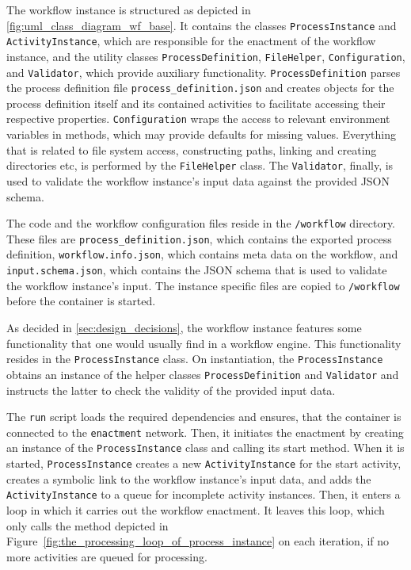     The workflow instance is structured as depicted in \ref{fig:uml_class_diagram_wf_base}. It contains the classes \texttt{ProcessInstance} and \texttt{ActivityInstance}, which are responsible for the enactment of the workflow instance, and the utility classes \texttt{ProcessDefinition}, \texttt{FileHelper}, \texttt{Configuration}, and \texttt{Validator}, which provide auxiliary functionality.
    \texttt{ProcessDefinition} parses the process definition file \texttt{process\_definition.json} and creates objects for the process definition itself and its contained activities to facilitate accessing their respective properties.
    \texttt{Configuration} wraps the access to relevant environment variables in methods, which may provide defaults for missing values. Everything that is related to file system access, \eg constructing paths, linking and creating directories etc, is performed by the \texttt{FileHelper} class. The \texttt{Validator}, finally, is used to validate the workflow instance's input data against the provided \ac{JSON} schema.

    The code and the workflow configuration files reside in the \texttt{/workflow} directory. These files are \texttt{process\_definition.json}, which contains the exported process definition, \texttt{workflow.info.json}, which contains meta data on the workflow, and \texttt{input.schema.json}, which contains the \ac{JSON} schema that is used to validate the workflow instance's input. The instance specific files are copied to \texttt{/workflow} before the container is started.

    As decided in \ref{sec:design_decisions}, the workflow instance features some functionality that one would usually find in a workflow engine. This functionality resides in the \texttt{ProcessInstance} class. On instantiation, the \texttt{ProcessInstance} obtains an instance of the helper classes \texttt{ProcessDefinition} and \texttt{Validator} and instructs the latter to check the validity of the provided input data.

    The \texttt{run} script loads the required dependencies and ensures, that the container is connected to the \texttt{enactment} network. Then, it initiates the enactment by creating an instance of the \texttt{ProcessInstance} class and calling its start method.
    When it is started, \texttt{ProcessInstance} creates a new \texttt{ActivityInstance} for the start activity, creates a symbolic link to the workflow instance's input data, and adds the \texttt{ActivityInstance} to a queue for incomplete activity instances. Then, it enters a loop in which it carries out the workflow enactment. It leaves this loop, which only calls the method depicted in Figure~\ref{fig:the_processing_loop_of_process_instance} on each iteration, if no more activities are queued for processing.

